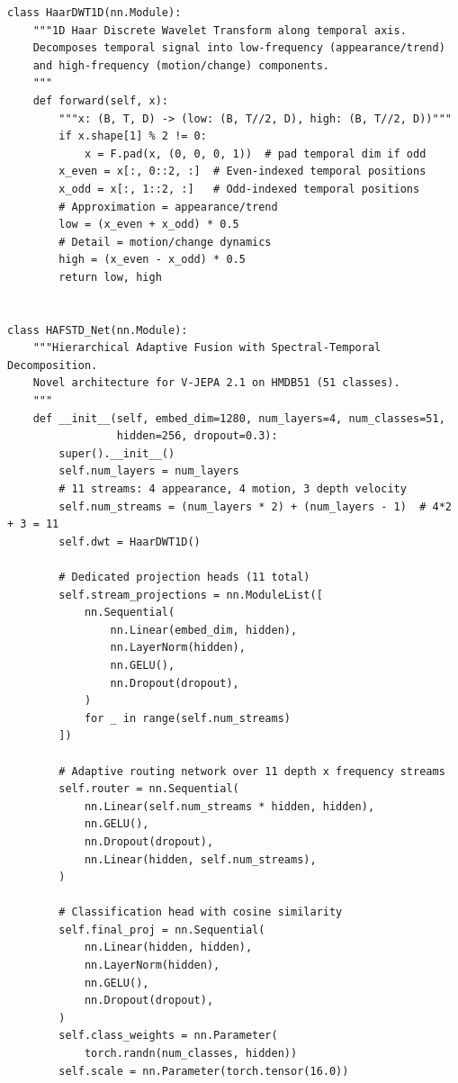 \begin{lstlisting}[caption={HAF-STD Net architecture and spectral-temporal decomposition (HMDB51 configuration).}, label={lst:hafstd_arch}]
class HaarDWT1D(nn.Module):
    """1D Haar Discrete Wavelet Transform along temporal axis.
    Decomposes temporal signal into low-frequency (appearance/trend)
    and high-frequency (motion/change) components.
    """
    def forward(self, x):
        """x: (B, T, D) -> (low: (B, T//2, D), high: (B, T//2, D))"""
        if x.shape[1] % 2 != 0:
            x = F.pad(x, (0, 0, 0, 1))  # pad temporal dim if odd
        x_even = x[:, 0::2, :]  # Even-indexed temporal positions
        x_odd = x[:, 1::2, :]   # Odd-indexed temporal positions
        # Approximation = appearance/trend
        low = (x_even + x_odd) * 0.5
        # Detail = motion/change dynamics
        high = (x_even - x_odd) * 0.5
        return low, high


class HAFSTD_Net(nn.Module):
    """Hierarchical Adaptive Fusion with Spectral-Temporal Decomposition.
    Novel architecture for V-JEPA 2.1 on HMDB51 (51 classes).
    """
    def __init__(self, embed_dim=1280, num_layers=4, num_classes=51,
                 hidden=256, dropout=0.3):
        super().__init__()
        self.num_layers = num_layers
        # 11 streams: 4 appearance, 4 motion, 3 depth velocity
        self.num_streams = (num_layers * 2) + (num_layers - 1)  # 4*2 + 3 = 11
        self.dwt = HaarDWT1D()

        # Dedicated projection heads (11 total)
        self.stream_projections = nn.ModuleList([
            nn.Sequential(
                nn.Linear(embed_dim, hidden),
                nn.LayerNorm(hidden),
                nn.GELU(),
                nn.Dropout(dropout),
            )
            for _ in range(self.num_streams)
        ])

        # Adaptive routing network over 11 depth x frequency streams
        self.router = nn.Sequential(
            nn.Linear(self.num_streams * hidden, hidden),
            nn.GELU(),
            nn.Dropout(dropout),
            nn.Linear(hidden, self.num_streams),
        )

        # Classification head with cosine similarity
        self.final_proj = nn.Sequential(
            nn.Linear(hidden, hidden),
            nn.LayerNorm(hidden),
            nn.GELU(),
            nn.Dropout(dropout),
        )
        self.class_weights = nn.Parameter(
            torch.randn(num_classes, hidden))
        self.scale = nn.Parameter(torch.tensor(16.0))


\end{lstlisting}

